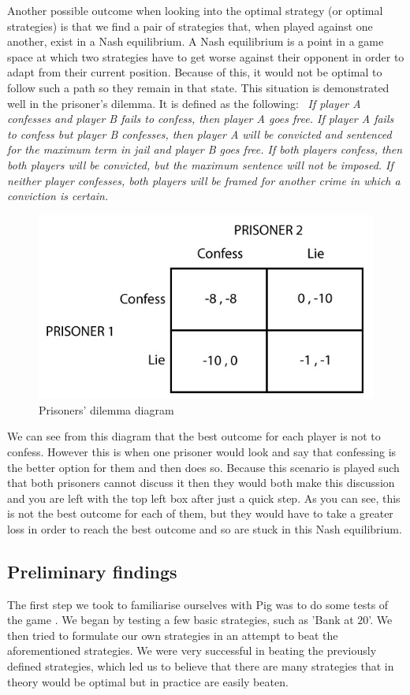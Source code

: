 \documentclass[a4paper,titlepage]{article}
\begin{document}
Another possible outcome when looking into the optimal strategy (or optimal strategies) is that we find a pair of strategies that, when played against one another, exist in a Nash equilibrium. A Nash equilibrium\cite{nash} is a point in a game space at which two strategies have to get worse against their opponent in order to adapt from their current position. Because of this, it would not be optimal to follow such a path so they remain in that state. This situation is demonstrated well in the prisoner's dilemma. It is defined as the following: \ \textit{If player A confesses and player B fails to confess, then player A goes free. If player A fails to confess but player B confesses, then player A will be convicted and sentenced for the maximum term in jail and player B goes free. If both players confess, then both players will be convicted, but the maximum sentence will not be imposed. If neither player confesses, both players will be framed for another crime in which a conviction is certain.}
\\
\begin{figure}
\centering
\includegraphics[scale=0.8]{prisoners_dilemma}
\caption{Prisoners' dilemma diagram\label{figure3}}
\end{figure}
We can see from this diagram that the best outcome for each player is not to confess. However this is when one prisoner would look and say that confessing is the better option for them and then does so. Because this scenario is played such that both prisoners cannot discuss it then they would both make this discussion and you are left with the top left box after just a quick step. As you can see, this is not the best outcome for each of them, but they would have to take a greater loss in order to reach the best outcome and so are stuck in this Nash equilibrium.
\subsection{Preliminary findings}
The first step we took to familiarise ourselves with Pig was to do some tests of the game . We began by testing a few basic strategies, such as 'Bank at $20$'. We then tried to formulate our own strategies in an attempt to beat the aforementioned strategies. We were very successful in beating the previously defined strategies, which led us to believe that there are many strategies that in theory would be optimal but in practice are easily beaten.
\end{document}
